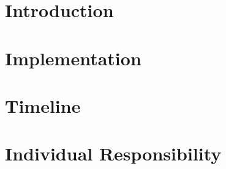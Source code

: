 \documentclass{article}
\begin{document}
\maketitle


\section{Introduction}

\section{Implementation}

\section{Timeline}

\section{Individual Responsibility}
\end{document}
